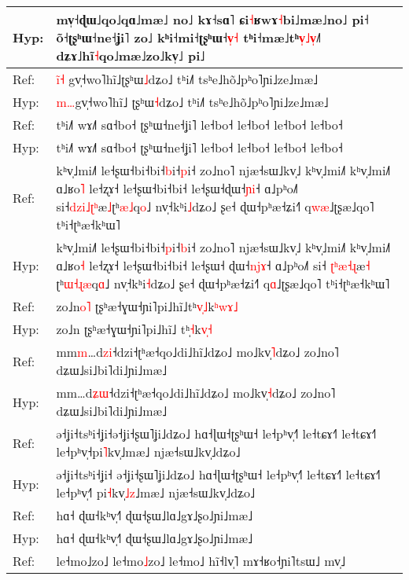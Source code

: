 \documentclass[10pt]{article}
\DeclareRobustCommand{\hl}[1]{{\textcolor{red}{#1}}}
\begin{document}
\begin{longtable}{ll}
Hyp: & mv̩˧ɖɯ˩qo˩qɑ˩mæ˩\hl{ }no˩ kɤ˧sɑ˥\hl{ }ɕi\hl{˧}ʁwɤ\hl{˧}bi˩mæ˩no˩ pi˧ õ˧ʈʂʰɯ˧ne˧ʝi˥\hl{ }zo˩ kʰi˧mi˧ʈʂʰɯ˧\hl{v}\hl{̩}\hl{˧} tʰi˧mæ˩tʰ\hl{v}\hl{̩}\hl{˩}\hl{v}\hl{̩}˩˥ dʑɤ˩hĩ\hl{˧}qo˩mæ˩zo˩kv̩˩\hl{ }pi˩ \\ 
\midrule 
Ref: & \hl{i}\hl{̃}\hl{˧}\hl{ }gv̩˧wo˥hĩ˩ʈʂʰɯ\hl{˩}dʑo˩ tʰi˩˥ tsʰe˩hõ˩pʰo˥ɲi˩ze˩mæ˩ \\ 
Hyp: & \hl{m}\hl{…}gv̩˧wo˥hĩ˩\hl{ }ʈʂʰɯ\hl{˧}dʑo˩ tʰi˩˥ tsʰe˩hõ˩pʰo˥ɲi˩ze˩mæ˩ \\ 
\midrule 
Ref: & tʰi˩˥ wɤ˩˥ sɑ˧bo˧ ʈʂʰɯ˧ne˧ʝi˥ le˧bo˧ le˧bo˧ le˧bo˧ le˧bo˧ \\ 
Hyp: & tʰi˩˥ wɤ˩˥ sɑ˧bo˧ ʈʂʰɯ˧ne˧ʝi˥ le˧bo˧ le˧bo˧ le˧bo˧ le˧bo˧ \\ 
\midrule 
Ref: & kʰv̩˩mi˩˥ le˧ʂɯ˧bi˧bi˧\hl{b}i˧\hl{p}i˧ zo˩no˥ njæ˧sɯ˩kv̩˩ kʰv̩˩mi˩˥ kʰv̩˩mi˩˥ ɑ˩ʁo\hl{˥} le˧ʐɤ˧ le˧ʂɯ˧bi˧bi˧ le˧ʂɯ˧ɖɯ˧\hl{ɲ}\hl{i}˧ ɑ˩pʰo˩˥ si˧\hl{d}\hl{z}\hl{i}\hl{˩}\hl{ʈ}\hl{ʰ}æ\hl{˩}ʈʰ\hl{æ}\hl{˩}q\hl{o}˩ nv̩˧kʰi\hl{˩}dʑo˩ ʂe˧ ɖɯ˧pʰæ˧ʑi˧˥ q\hl{w}\hl{æ}˩ʈʂæ˩qo˥ tʰi˧ʈʰæ˧kʰɯ˥ \\ 
Hyp: & kʰv̩˩mi˩˥ le˧ʂɯ˧bi˧bi˧\hl{p}i˧\hl{b}i˧ zo˩no˥ njæ˧sɯ˩kv̩˩ kʰv̩˩mi˩˥ kʰv̩˩mi˩˥ ɑ˩ʁo\hl{˧} le˧ʐɤ˧ le˧ʂɯ˧bi˧bi˧ le˧ʂɯ˧\hl{ }ɖɯ˧\hl{n}\hl{j}\hl{ɤ}˧ ɑ˩pʰo˩˥ si˧\hl{ }\hl{ʈ}\hl{ʰ}\hl{æ}\hl{˧}\hl{ɻ}æ\hl{˧}\hl{ }ʈʰ\hl{ɯ}\hl{˧}\hl{ɻ}\hl{æ}q\hl{ɑ}˩ nv̩˧kʰi\hl{˧}dʑo˩ ʂe˧ ɖɯ˧pʰæ˧ʑi˧˥ q\hl{ɑ}˩ʈʂæ˩qo˥ tʰi˧ʈʰæ˧kʰɯ˥ \\ 
\midrule 
Ref: & zo˩n\hl{o}\hl{˥} ʈʂʰæ˧ɣɯ˧ɲi˥pi˩hĩ˩tʰ\hl{v}̩\hl{˩}k\hl{ʰ}\hl{w}\hl{ɤ}\hl{˩} \\ 
Hyp: & zo˩n ʈʂʰæ˧ɣɯ˧ɲi˥pi˩hĩ˩\hl{ }tʰ̩\hl{˧}k\hl{v}\hl{̩}\hl{˧} \\ 
\midrule 
Ref: & mm\hl{m}…d\hl{z}\hl{i}˧dzi˧ʈʰæ˧qo˩di˩hĩ˩dʑo˩ mo˩kv̩\hl{˥}dʑo˩ zo˩no˥ dʑɯ˩si˩bi˥di˩ɲi˩mæ˩ \\ 
Hyp: & mm…d\hl{ʑ}\hl{ɯ}˧dzi˧ʈʰæ˧qo˩di˩hĩ˩dʑo˩ mo˩kv̩\hl{˧}dʑo˩ zo˩no˥ dʑɯ˩si˩bi˥di˩ɲi˩mæ˩ \\ 
\midrule 
Ref: & ə˧ʝi˧tsʰi˧ʝi˧ə˧ʝi˧ʂɯ˥ʝi˩dʑo˩ hɑ˧ɭɯ˧ʈʂʰɯ˧ le˧pʰv̩˧˥ le˧tɕɤ˧˥ le˧tɕɤ˧˥ le˧pʰv̩˧pi\hl{˥}kv̩˩mæ˩ njæ˧sɯ˩kv̩˩dʑo˩ \\ 
Hyp: & ə˧ʝi˧tsʰi˧ʝi˧\hl{ }ə˧ʝi˧ʂɯ˥ʝi˩dʑo˩ hɑ˧ɭɯ˧ʈʂʰɯ˧ le˧pʰv̩˧˥ le˧tɕɤ˧˥ le˧tɕɤ˧˥ le˧pʰv̩˧\hl{˥}\hl{ }pi\hl{˧}kv̩\hl{˩}\hl{z}˩mæ˩ njæ˧sɯ˩kv̩˩dʑo˩ \\ 
\midrule 
Ref: & hɑ˧ ɖɯ˧kʰv̩˧˥ ɖɯ˧ʂɯ˩lɑ˩gɤ˩ʂo˩ɲi˩mæ˩ \\ 
Hyp: & hɑ˧ ɖɯ˧kʰv̩˧˥ ɖɯ˧ʂɯ˩lɑ˩gɤ˩ʂo˩ɲi˩mæ˩ \\ 
\midrule 
Ref: & le˧mo˩zo˩ le˧mo\hl{˩}zo˩ le˧mo˩ hĩ˧lv̩˥ mɤ˧ʁo˧ɲi˥tsɯ˩ mv̩˩ \\ 

\end{longtable}
\end{document}
